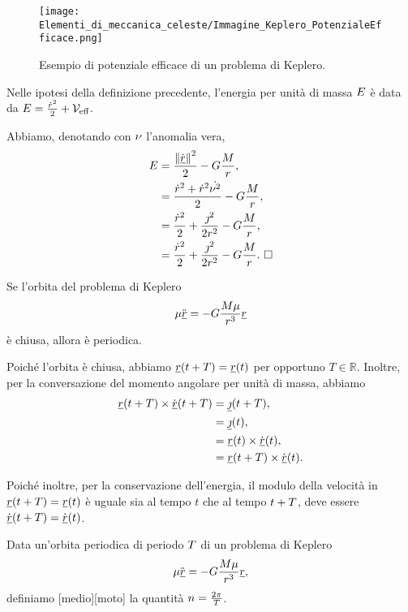 \begin{figure}
	\texttt{[image: Elementi\_di\_meccanica\_celeste/Immagine\_Keplero\_PotenzialeEfficace.png]}
	\centering
	\caption{Esempio di potenziale efficace di un problema di Keplero.}
\end{figure}
\begin{Theorem}
	Nelle ipotesi della definizione precedente, l'energia per unit\`a di massa $E$ \`e data da $E = \frac{\dot{r}^2}{2} + \mathcal{V}_{\text{eff}}$.
\end{Theorem}
\Proof Abbiamo, denotando con $\nu$ l'anomalia vera,
\begin{align*}
	\EnergyPerUnitMass
	&= \frac{\Norm{\dot{\vec{r}}}^2}{2} - \NewtonConstant\frac{\TotalMass}{r},\\
	&= \frac{\dot{r}^2 + \dot{r}^2\dot{\TrueAnomaly^2}}{2} - \NewtonConstant\frac{\TotalMass}{r},\\
	&= \frac{\dot{r}^2}{2} + \frac{\AngularMomentPerUnitMass^2}{2r^2} - \NewtonConstant\frac{\TotalMass}{r},\\
	&= \frac{\dot{r}^2}{2} + \frac{\AngularMomentPerUnitMass^2}{2r^2} - \NewtonConstant\frac{\TotalMass}{r}.\text{ \EndProof}
\end{align*}
\begin{Theorem}
	Se l'orbita del problema di Keplero
	\[
		\mu \ddot{\underline{r}} = - G \frac{M\mu}{r^3}\underline{r}
	\]
	\`e chiusa, allora \`e periodica.
\end{Theorem}
\Proof Poich\'e l'orbita \`e chiusa, abbiamo $\underline{r}(t + T) = \underline{r}(t)$ per opportuno $T \in \mathbb{R}$. Inoltre, per la conversazione del momento angolare per unit\`a di massa, abbiamo
\begin{align*}
	\underline{r}(t + T) \times \dot{\underline{r}}(t + T)
	&= \underline{\jmath}(t + T),\\
	&= \underline{\jmath}(t),\\
	&= \underline{r}(t) \times \dot{\underline{r}}(t),\\
	&= \underline{r}(t + T) \times \dot{\underline{r}}(t).
\end{align*}
\par Poich\'e inoltre, per la conservazione dell'energia, il modulo della velocit\`a in $\underline{r}(t + T) = \underline{r}(t)$ \`e uguale sia al tempo $t$ che al tempo $t + T$, deve essere $\dot{\underline{r}}(t + T) = \dot{\underline{r}}(t)$. \EndProof
\begin{Definition}
	Data un'orbita periodica di periodo $T$ di un problema di Keplero
	\[
		\mu \ddot{\underline{r}} = - G \frac{M\mu}{r^3}\underline{r},
	\]
	definiamo [medio][moto] la quantit\`a $n = \frac{2\pi}{T}$.
\end{Definition}
